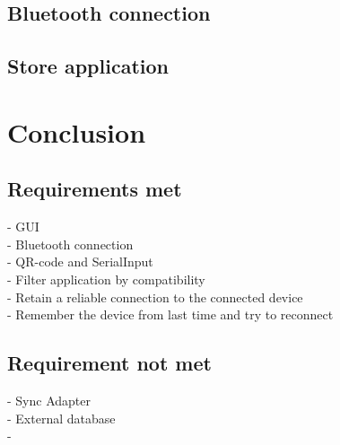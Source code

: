 		\subsection{Bluetooth connection}

		\subsection{Store application}

		
	\section{Conclusion}


	\subsection{Requirements met}
			- GUI\\
			- Bluetooth connection\\
			- QR-code and SerialInput\\
			- Filter application by compatibility\\
			- Retain a reliable connection to the connected device\\
			- Remember the device from last time and try to reconnect\\

		\subsection{Requirement not met}
			- Sync Adapter\\
			- External database\\
			- 